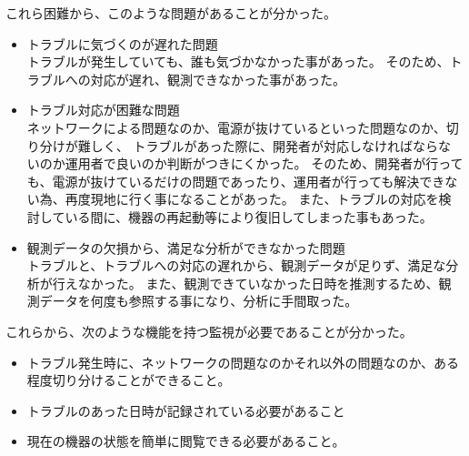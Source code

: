 これら困難から、このような問題があることが分かった。
\begin{itemize}
\item トラブルに気づくのが遅れた問題\\
	トラブルが発生していても、誰も気づかなかった事があった。
	そのため、トラブルへの対応が遅れ、観測できなかった事があった。
\item トラブル対応が困難な問題\\
	ネットワークによる問題なのか、電源が抜けているといった問題なのか、切り分けが難しく、
	トラブルがあった際に、開発者が対応しなければならないのか運用者で良いのか判断がつきにくかった。
	そのため、開発者が行っても、電源が抜けているだけの問題であったり、運用者が行っても解決できない為、再度現地に行く事になることがあった。
	また、トラブルの対応を検討している間に、機器の再起動等により復旧してしまった事もあった。
\item 観測データの欠損から、満足な分析ができなかった問題\\
	トラブルと、トラブルへの対応の遅れから、観測データが足りず、満足な分析が行えなかった。
	また、観測できていなかった日時を推測するため、観測データを何度も参照する事になり、分析に手間取った。
\end{itemize}

これらから、次のような機能を持つ監視が必要であることが分かった。
\begin{itemize}
\item トラブル発生時に、ネットワークの問題なのかそれ以外の問題なのか、ある程度切り分けることができること。
\item トラブルのあった日時が記録されている必要があること
\item 現在の機器の状態を簡単に閲覧できる必要があること。
\end{itemize}


